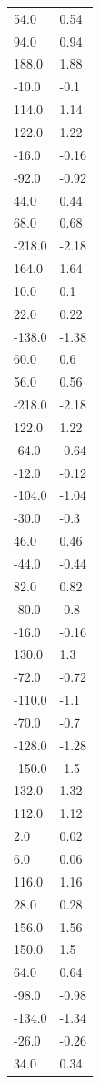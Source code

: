\begin{longtable}{ll}
54.0 & 0.54 \\
94.0 & 0.94 \\
188.0 & 1.88 \\
-10.0 & -0.1 \\
114.0 & 1.14 \\
122.0 & 1.22 \\
-16.0 & -0.16 \\
-92.0 & -0.92 \\
44.0 & 0.44 \\
68.0 & 0.68 \\
-218.0 & -2.18 \\
164.0 & 1.64 \\
10.0 & 0.1 \\
22.0 & 0.22 \\
-138.0 & -1.38 \\
60.0 & 0.6 \\
56.0 & 0.56 \\
-218.0 & -2.18 \\
122.0 & 1.22 \\
-64.0 & -0.64 \\
-12.0 & -0.12 \\
-104.0 & -1.04 \\
-30.0 & -0.3 \\
46.0 & 0.46 \\
-44.0 & -0.44 \\
82.0 & 0.82 \\
-80.0 & -0.8 \\
-16.0 & -0.16 \\
130.0 & 1.3 \\
-72.0 & -0.72 \\
-110.0 & -1.1 \\
-70.0 & -0.7 \\
-128.0 & -1.28 \\
-150.0 & -1.5 \\
132.0 & 1.32 \\
112.0 & 1.12 \\
2.0 & 0.02 \\
6.0 & 0.06 \\
116.0 & 1.16 \\
28.0 & 0.28 \\
156.0 & 1.56 \\
150.0 & 1.5 \\
64.0 & 0.64 \\
-98.0 & -0.98 \\
-134.0 & -1.34 \\
-26.0 & -0.26 \\
34.0 & 0.34 \\

\end{longtable}

